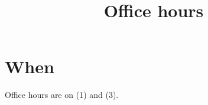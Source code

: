 \documentclass{article}
\title{Office hours}
\begin{document}
\maketitle
\section{When}
Office hours are on \Days(1) and \Days(3).
\end{document}
